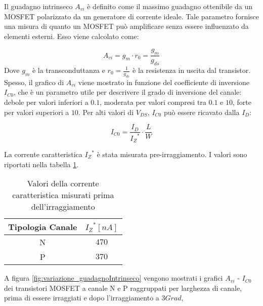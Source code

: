 Il guadagno intrinseco $A_{vi}$ è definito come il massimo guadagno ottenibile da un MOSFET polarizzato da un generatore di corrente ideale.
Tale parametro fornisce una misura di quanto un MOSFET può amplificare senza essere influenzato da elementi esterni.
Esso viene calcolato come:

\begin{equation}
    A_{vi} = g_{m} \cdot r_0 = \frac{g_{m}}{g_{ds}}
\end{equation}
Dove  $g_m$ è la transconduttanza e $r_0 = \frac{1}{g_{ds}}$ è la resistenza in uscita dal transistor. Spesso, il grafico di $A_{vi}$ viene mostrato in funzione del coefficiente di inversione $I_{C0}$, che è un parametro utile per descrivere il grado di inversione del canale: debole per valori inferiori a $0.1$, moderata per valori compresi tra $0.1$ e $10$, forte per valori superiori a $10$. Per alti valori di $V_{DS}$, $I_{C0}$ può essere ricavato dalla $I_D$:

\begin{equation}
    I_{C0} = \frac{I_{D}}{{I_{Z}}^{*}} \cdot \frac{L}{W}
\end{equation}

La corrente caratteristica ${I_{Z}}^{*}$ è stata misurata pre-irraggiamento. I valori sono riportati nella tabella \ref{tab:corrente_caratteristica}.

\begin{table}[ht]
    \centering
    \begin{tabular}{c c}
        \toprule
        Tipologia Canale & ${I_{Z}}^{*}[nA]$ \\
        \midrule
        N                & $470$     \\
        P                & $370$     \\
        \bottomrule
    \end{tabular}
    \caption[Valori estratti $I_z^*$]{Valori della corrente caratteristica misurati prima dell'irraggiamento}
    \label{tab:corrente_caratteristica}
\end{table}


A figura \ref{fig:variazione_guadagnoIntrinseco} vengono mostrati i grafici $A_{vi}$ - $I_{C0}$ dei transistori MOSFET a canale N e P raggruppati per larghezza di canale, prima di essere irraggiati e dopo l'irraggiamento a $3Grad$, 


